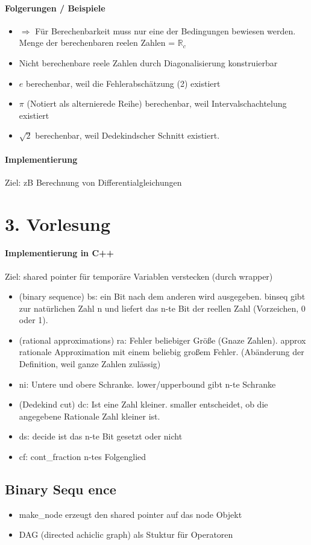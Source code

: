 \documentclass[ngerman]{scrartcl}
\begin{document}
 \paragraph{Folgerungen / Beispiele}
\begin{itemize}
  \item $ \Rightarrow $ Für Berechenbarkeit muss nur eine der Bedingungen bewiesen werden. Menge der berechenbaren reelen Zahlen = $ \mathbb{R}_c $
  \item Nicht berechenbare reele Zahlen durch Diagonalisierung konstruierbar
  \item $ e $ berechenbar, weil die Fehlerabschätzung (2) existiert
  \item $ \pi $ (Notiert als alternierede Reihe) berechenbar, weil Intervalschachtelung existiert
  \item $ \sqrt{2} $ berechenbar, weil Dedekindscher Schnitt existiert.
 \end{itemize}

\paragraph{Implementierung}
Ziel: zB Berechnung von Differentialgleichungen 

\section{3. Vorlesung}
\paragraph{Implementierung in C++}
Ziel: shared pointer für temporäre Variablen verstecken (durch wrapper)
\begin{itemize}
  \item (binary sequence) bs: ein Bit nach dem anderen wird ausgegeben. binseq gibt zur natürlichen Zahl n und liefert das n-te Bit der reellen Zahl (Vorzeichen, 0 oder 1).
  \item (rational approximations) ra: Fehler beliebiger Größe (Gnaze Zahlen). approx rationale Approximation mit einem beliebig großem Fehler. (Abänderung der Definition, weil ganze Zahlen zulässig)
  \item ni: Untere und obere Schranke. lower/upperbound gibt n-te Schranke
  \item (Dedekind cut) dc: Ist eine Zahl kleiner. smaller entscheidet, ob die angegebene Rationale Zahl kleiner ist.
  \item ds: decide ist das n-te Bit gesetzt oder nicht
  \item cf: cont_fraction n-tes Folgenglied
\end{itemize}

\subsection{Binary Sequ ence}
\begin{itemize}
  \item make_node erzeugt den shared pointer auf das node Objekt
  \item DAG (directed achiclic graph) als Stuktur für Operatoren
\end{itemize}
\end{document}
